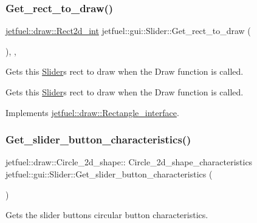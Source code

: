 \subsubsection{\texorpdfstring{Get\+\_\+rect\+\_\+to\+\_\+draw()}{Get\_rect\_to\_draw()}}
{\footnotesize\ttfamily \hyperlink{classjetfuel_1_1draw_1_1Rect2d}{jetfuel\+::draw\+::\+Rect2d\+\_\+int} jetfuel\+::gui\+::\+Slider\+::\+Get\+\_\+rect\+\_\+to\+\_\+draw (\begin{DoxyParamCaption}{ }\end{DoxyParamCaption})\hspace{0.3cm}{\ttfamily [inline]}, {\ttfamily [override]}, {\ttfamily [virtual]}}



Gets this \hyperlink{classjetfuel_1_1gui_1_1Slider}{Slider}\textquotesingle{}s rect to draw when the Draw function is called. 

Gets this \hyperlink{classjetfuel_1_1gui_1_1Slider}{Slider}\textquotesingle{}s rect to draw when the Draw function is called. 

Implements \hyperlink{classjetfuel_1_1draw_1_1Rectangle__interface_a03fd3b6842ab7b3065379caec407296f}{jetfuel\+::draw\+::\+Rectangle\+\_\+interface}.

\mbox{\label{classjetfuel_1_1gui_1_1Slider_a179af5f98738a5011b8608e656fdb090}} 
\subsubsection{\texorpdfstring{Get\+\_\+slider\+\_\+button\+\_\+characteristics()}{Get\_slider\_button\_characteristics()}}
{\footnotesize\ttfamily jetfuel\+::draw\+::\+Circle\+\_\+2d\+\_\+shape\+:: Circle\+\_\+2d\+\_\+shape\+\_\+characteristics jetfuel\+::gui\+::\+Slider\+::\+Get\+\_\+slider\+\_\+button\+\_\+characteristics (\begin{DoxyParamCaption}{ }\end{DoxyParamCaption})\hspace{0.3cm}{\ttfamily [inline]}}



Gets the slider button\textquotesingle{}s circular button characteristics. 

